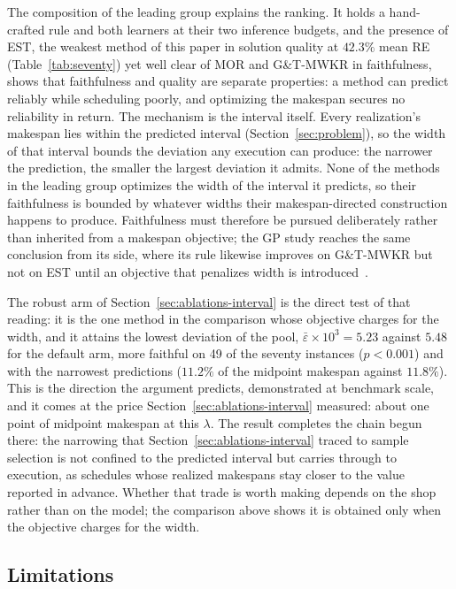 \documentclass[preprint,12pt]{elsarticle}
\theoremstyle{definition}
\theoremstyle{remark}
\begin{document}
The composition of the leading group explains the ranking. It holds a
hand-crafted rule and both learners at their two inference budgets,
and the presence of EST, the weakest method of this paper
in solution quality at $42.3\%$ mean RE
(Table~\ref{tab:seventy}) yet well clear of MOR and G\&T-MWKR in
faithfulness, shows that faithfulness and quality are separate
properties: a method can predict reliably while scheduling poorly,
and optimizing the makespan secures no reliability in return.
The mechanism is the interval itself. Every realization's makespan
lies within the predicted interval (Section~\ref{sec:problem}), so
the width of that interval bounds the deviation any execution can
produce: the narrower the prediction, the smaller the largest
deviation it admits. None of the methods in the leading group optimizes
the width of the interval it predicts, so their faithfulness is
bounded by whatever widths their makespan-directed construction
happens to produce. Faithfulness must therefore be pursued
deliberately rather than inherited from a makespan objective; the GP
study reaches the same conclusion from its side, where its rule
likewise improves on G\&T-MWKR but not on EST until an objective that
penalizes width is introduced~\citep{DiazGP2026}.

The robust arm of Section~\ref{sec:ablations-interval} is the direct
test of that reading: it is the one method in the comparison whose
objective charges for the width, and it attains the lowest deviation
of the pool, $\bar\varepsilon\times10^{3}=5.23$ against $5.48$ for
the default arm, more faithful on 49 of the seventy instances
($p<0.001$) and with the narrowest predictions ($11.2\%$ of the
midpoint makespan against $11.8\%$). This is the direction the
argument predicts, demonstrated at benchmark scale, and it comes at
the price Section~\ref{sec:ablations-interval} measured: about one
point of midpoint makespan at this $\lambda$. The result completes the chain begun there: the
narrowing that Section~\ref{sec:ablations-interval} traced to sample
selection is not confined to the predicted interval but carries
through to execution, as schedules whose realized makespans stay
closer to the value reported in advance. Whether that trade is worth
making depends on the shop rather than on the model; the comparison
above shows it is obtained only when the objective charges for the
width.


\subsection{Limitations}
\label{sec:limitations}
\end{document}

